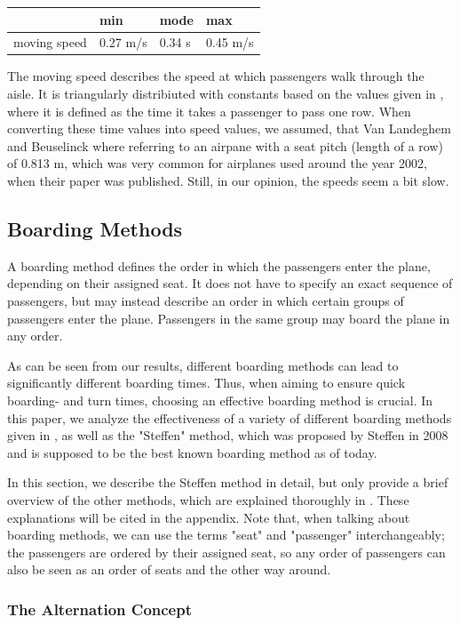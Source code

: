 \documentclass[11pt]{article}
\begin{document}
\begin{tabular}{l|l l l}

	&min &mode&max \\
	\hline
moving speed &0.27 m/s&0.34 s& 0.45 m/s   \\
	\hline
\end{tabular}
The moving speed describes the speed at which passengers walk through the aisle. It is triangularly distribiuted with constants based on the values given in \cite{beus}, where it is defined as the time it takes a passenger to pass one row. When converting these time values into speed values, we assumed, that Van Landeghem and Beuselinck where referring to an airpane with a seat pitch (length of a row) of 0.813 m, which was very common for airplanes used around the year 2002, when their paper was published. Still, in our opinion, the speeds seem a bit slow.


\subsection{Boarding Methods}
A boarding method defines the order in which the passengers enter the plane, depending on their assigned seat. It does not have to specify an exact sequence of passengers, but may instead describe an order in which certain groups of passengers enter the plane. Passengers in the same group may board the plane in any order. 


As can be seen from our results, different boarding methods can lead to significantly different boarding times. Thus, when aiming to ensure quick boarding- and turn times, choosing an effective boarding method is crucial. In this paper, we analyze the effectiveness of a variety of different boarding methods given in \cite{beus}, as well as the "Steffen" method, which was proposed by Steffen \cite{steffen} in 2008 and is supposed to be the best known boarding method as of today.



In this section, we describe the Steffen method in detail, but only provide a brief overview of the other methods, which are explained thoroughly in \cite{beus}. These explanations will be cited in the appendix. Note that, when talking about boarding methods, we can use the terms "seat" and "passenger" interchangeably; the passengers are ordered by their assigned seat, so any order of passengers can also be seen as an order of seats and the other way around.


\subsubsection{The Alternation Concept}
\end{document}
